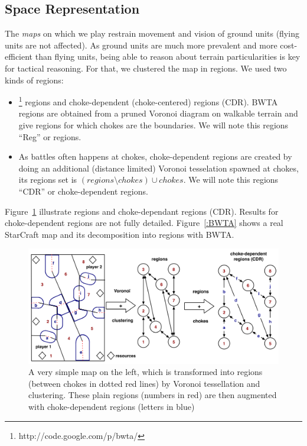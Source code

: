 \subsection{Space Representation}
The \textit{maps} on which we play restrain movement and vision of ground units (flying units are not affected). As ground units are much more prevalent and more cost-efficient than flying units, being able to reason about terrain particularities is key for tactical reasoning. For that, we clustered the map in regions. 
We used two kinds of regions: 
\begin{itemize}
    \item {}\footnote{http://code.google.com/p/bwta/} regions and choke-dependent (choke-centered) regions (CDR). BWTA regions are obtained from a pruned Voronoi diagram on walkable terrain \citep{Perkins2010} and give regions for which chokes are the boundaries. We will note this regions ``Reg'' or regions.
    \item As battles often happens at chokes, choke-dependent regions are created by doing an additional (distance limited) Voronoi tesselation spawned at chokes, its regions set is $(regions \setminus chokes) \cup chokes$. We will note this regions ``CDR'' or choke-dependent regions.
\end{itemize}
Figure~\ref{fig:terrainanalysis} illustrate regions and choke-dependant regions (CDR). Results for choke-dependent regions are not fully detailed. Figure~\ref{:BWTA} shows a real StarCraft map and its decomposition into regions with BWTA.

\begin{figure}[!h]
\begin{center}
\includegraphics[width=16cm]{images/terrain_analysis.png}
\caption{A very simple map on the left, which is transformed into regions (between chokes in dotted red lines) by Voronoi tessellation and clustering. These plain regions (numbers in red) are then augmented with choke-dependent regions (letters in blue)}%
\label{fig:terrainanalysis}
\end{center}
\end{figure}

